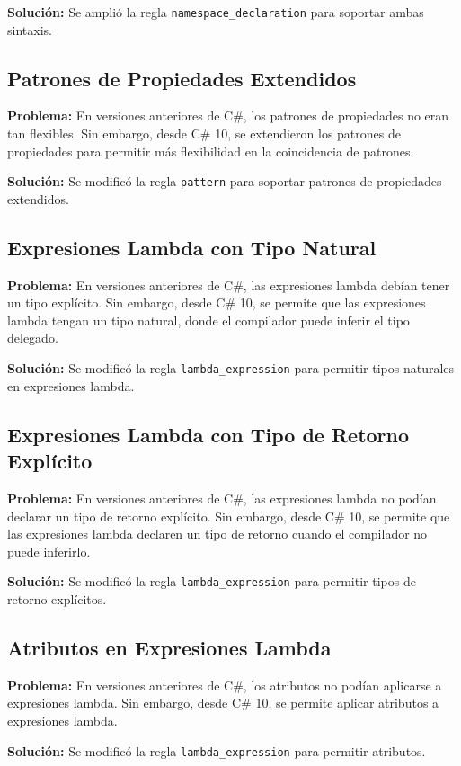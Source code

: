 \textbf{Solución:} Se amplió la regla \texttt{namespace\_declaration} para soportar ambas sintaxis.

\subsection{Patrones de Propiedades Extendidos}
\textbf{Problema:} En versiones anteriores de C\#, los patrones de propiedades no eran tan flexibles. Sin embargo, desde C\# 10, se extendieron los patrones de propiedades para permitir más flexibilidad en la coincidencia de patrones.

\textbf{Solución:} Se modificó la regla \texttt{pattern} para soportar patrones de propiedades extendidos.

\subsection{Expresiones Lambda con Tipo Natural}
\textbf{Problema:} En versiones anteriores de C\#, las expresiones lambda debían tener un tipo explícito. Sin embargo, desde C\# 10, se permite que las expresiones lambda tengan un tipo natural, donde el compilador puede inferir el tipo delegado.

\textbf{Solución:} Se modificó la regla \texttt{lambda\_expression} para permitir tipos naturales en expresiones lambda.

\subsection{Expresiones Lambda con Tipo de Retorno Explícito}
\textbf{Problema:} En versiones anteriores de C\#, las expresiones lambda no podían declarar un tipo de retorno explícito. Sin embargo, desde C\# 10, se permite que las expresiones lambda declaren un tipo de retorno cuando el compilador no puede inferirlo.

\textbf{Solución:} Se modificó la regla \texttt{lambda\_expression} para permitir tipos de retorno explícitos.

\subsection{Atributos en Expresiones Lambda}
\textbf{Problema:} En versiones anteriores de C\#, los atributos no podían aplicarse a expresiones lambda. Sin embargo, desde C\# 10, se permite aplicar atributos a expresiones lambda.

\textbf{Solución:} Se modificó la regla \texttt{lambda\_expression} para permitir atributos.

